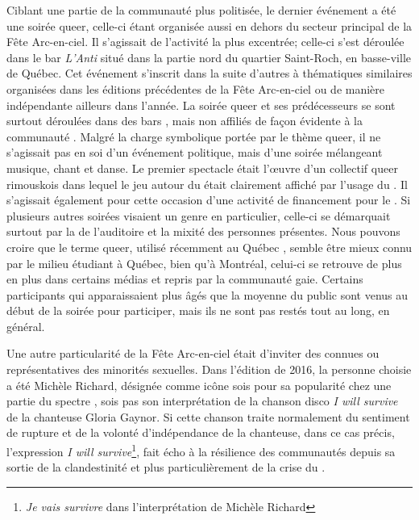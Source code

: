 Ciblant une partie de la communauté plus politisée, le dernier événement a été une soirée queer, celle-ci étant organisée aussi en dehors du secteur principal de la Fête Arc-en-ciel.
Il s'agissait de l'activité la plus excentrée; celle-ci s'est déroulée dans le bar \emph{L'Anti} situé dans la partie nord du quartier Saint-Roch, en basse-ville de Québec.
Cet événement  s'inscrit dans la suite d'autres à thématiques similaires organisées dans les éditions précédentes de la Fête Arc-en-ciel ou de manière indépendante ailleurs dans l'année.
La soirée queer et ses prédécesseurs se sont surtout déroulées dans des bars , mais non affiliés de façon évidente à la communauté \lgbt.
Malgré la charge symbolique portée par le thème queer, il ne s'agissait pas en soi d'un événement politique, mais d'une soirée mélangeant musique, chant et danse.
Le premier spectacle était l'œuvre d'un collectif queer rimouskois dans lequel le jeu autour du  était clairement affiché par l'usage du .
Il s'agissait également pour cette occasion d'une activité de financement pour le \ggul.
Si plusieurs autres soirées visaient un genre en particulier, celle-ci se démarquait surtout par la  de l'auditoire et la mixité des personnes présentes.
Nous pouvons croire que le terme queer, utilisé récemment au Québec \citep[voir][]{Laprade2014}, semble être mieux connu par le milieu étudiant \lgbt{} à Québec, bien qu'à Montréal, celui-ci se retrouve de plus en plus dans certains médias et repris par la communauté gaie.
Certains participants qui apparaissaient plus âgés que la moyenne du public sont venus au début de la soirée pour participer, mais ils ne sont pas restés tout au long, en général.

Une autre particularité de la Fête Arc-en-ciel était d'inviter des  connues ou représentatives des minorités sexuelles.
Dans l'édition de 2016, la personne choisie a été Michèle Richard, désignée comme icône sois pour sa popularité chez une partie du spectre \lgbt{}, sois pas son interprétation de la chanson disco \emph{I will survive} de la chanteuse Gloria Gaynor.
Si cette chanson traite normalement du sentiment de rupture et de la volonté d'indépendance de la chanteuse, dans ce cas précis, l'expression \emph{I will survive}\footnote{\emph{Je vais survivre} dans l'interprétation de Michèle Richard}, fait écho à la résilience des communautés \lgbt{} depuis sa sortie de la clandestinité et plus particulièrement de la crise du \vih{}.

